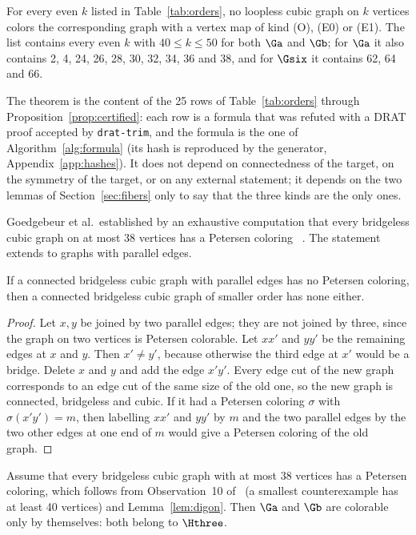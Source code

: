 \begin{theorem}\label{thm:orders}
For every even $k$ listed in Table~\ref{tab:orders}, no loopless cubic graph on $k$ vertices colors
the corresponding graph with a vertex map of kind \textup{(O)}, \textup{(E0)} or \textup{(E1)}.
The list contains every even $k$ with $40 \le k \le 50$ for both $\Ga$ and $\Gb$; for $\Ga$ it
also contains 2, 4, 24, 26, 28, 30, 32, 34, 36 and 38, and for $\Gsix$ it contains 62, 64 and 66.
\end{theorem}

The theorem is the content of the 25 rows of Table~\ref{tab:orders} through Proposition~\ref{prop:certified}: each row is a formula that was
refuted with a DRAT proof accepted by \texttt{drat-trim}, and the formula is the one of Algorithm~\ref{alg:formula} (its hash is reproduced by the generator,
Appendix~\ref{app:hashes}). It does not depend on connectedness of the target, on the symmetry of the target, or on any external statement; it depends on the two lemmas of
Section~\ref{sec:fibers} only to say that the three kinds are the only ones.

Goedgebeur et al.\ established by an exhaustive computation that every bridgeless cubic graph on
at most 38 vertices has a Petersen coloring~\cite[Observation~10]{GJMMMU2026} \evV{}. The statement
extends to graphs with parallel edges.

\begin{lemma}[\evD]\label{lem:digon}
If a connected bridgeless cubic graph with parallel edges has no Petersen coloring, then a
connected bridgeless cubic graph of smaller order has none either.
\end{lemma}

\begin{proof}
Let $x, y$ be joined by two parallel edges; they are not joined by three, since the graph on two
vertices is Petersen colorable. Let $xx'$ and $yy'$ be the remaining edges at $x$ and $y$. Then
$x' \ne y'$, because otherwise the third edge at $x'$ would be a bridge. Delete $x$ and $y$ and
add the edge $x'y'$. Every edge cut of the new graph corresponds to an edge cut of the same size
of the old one, so the new graph is connected, bridgeless and cubic. If it had a Petersen
coloring $\sigma$ with $\sigma(x'y') = m$, then labelling $xx'$ and $yy'$ by $m$ and the two
parallel edges by the two other edges at one end of $m$ would give a Petersen coloring of the
old graph.
\end{proof}

\begin{theorem}\label{thm:h3}
Assume that every bridgeless cubic graph with at most 38 vertices has a Petersen coloring, which follows from Observation~10 of~\cite{GJMMMU2026} (a smallest counterexample has at least 40 vertices) and Lemma~\ref{lem:digon}.
Then $\Ga$ and $\Gb$ are colorable only by themselves: both belong to $\Hthree$.
\end{theorem}


